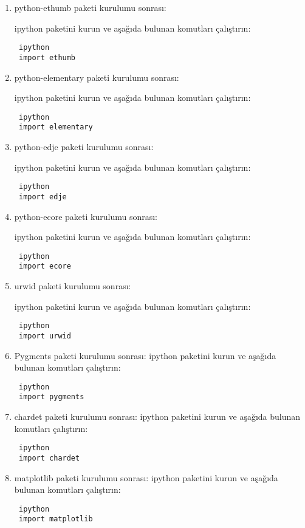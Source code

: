 \documentclass[a4paper,10pt]{article}
\begin{document}
\begin{enumerate}
\item python-ethumb paketi kurulumu sonrası:

ipython paketini kurun ve aşağıda bulunan komutları çalıştırın:
\begin{verbatim}
 ipython
 import ethumb
\end{verbatim}

\item python-elementary paketi kurulumu sonrası:

ipython paketini kurun ve aşağıda bulunan komutları çalıştırın:
\begin{verbatim}
 ipython
 import elementary
\end{verbatim}

\item python-edje paketi kurulumu sonrası:

ipython paketini kurun ve aşağıda bulunan komutları çalıştırın:
\begin{verbatim}
 ipython
 import edje
\end{verbatim}



\item python-ecore paketi kurulumu sonrası:

ipython paketini kurun ve aşağıda bulunan komutları çalıştırın:
\begin{verbatim}
 ipython
 import ecore
\end{verbatim}


\item urwid paketi kurulumu sonrası:

ipython paketini kurun ve aşağıda bulunan komutları çalıştırın:
\begin{verbatim}
 ipython
 import urwid
\end{verbatim}


\item Pygments paketi kurulumu sonrası:
ipython paketini kurun ve aşağıda bulunan komutları çalıştırın:
\begin{verbatim}
 ipython
 import pygments
\end{verbatim}

\item chardet paketi kurulumu sonrası:
ipython paketini kurun ve aşağıda bulunan komutları çalıştırın:
\begin{verbatim}
 ipython
 import chardet
\end{verbatim}

\item matplotlib paketi kurulumu sonrası:
ipython paketini kurun ve aşağıda bulunan komutları çalıştırın:
\begin{verbatim}
 ipython
 import matplotlib
\end{verbatim}


\end{enumerate}
\end{document}
